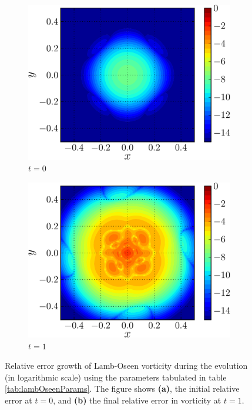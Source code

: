 	\begin{figure}[!t]
     \centering
     \begin{subfigure}[b]{0.45\textwidth}
             \includegraphics[width=\textwidth]{figures/lagrangian/lambOseen_intialError_wRel-crop.png}
             \caption{$t=0$}
             \label{fig:lambOseen_convection_vorticityErrorContours_initial}
     \end{subfigure}%
     \qquad %
     \begin{subfigure}[b]{0.45\textwidth}
             \includegraphics[width=\textwidth]{figures/lagrangian/lambOseen_finalErrorEvolution_wRel-crop.png}
             \caption{$t=1$}
             \label{fig:lambOseen_convection_vorticityErrorContours_final}
     \end{subfigure}
     
     \caption{Relative error growth of Lamb-Oseen vorticity during the evolution (in logarithmic scale) using the parameters tabulated in table \ref{tab:lambOseenParams}. The figure shows \textbf{(a)}, the initial relative error at $t=0$, and \textbf{(b)} the final relative error in vorticity at $t=1$.}
     \label{fig:lambOseen_convection_vorticityErrorContours}
	\end{figure}

